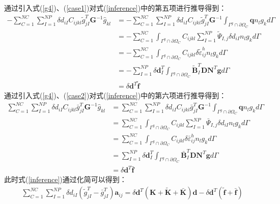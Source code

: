 通过引入式(\ref{g4})、(\ref{case1})对式(\ref{inference})中的第五项进行推导得到：
\begin{equation}
\begin{split}
    -\sum_{C=1}^{N\!C}\sum_{I=1}^{N\!P}\delta d_{iI}C_{ijkl}\tilde{g}^T_{jI}\pmb{G}^{-1}\hat{g}_{kl}
    &=-\sum_{C=1}^{N\!C}\sum_{I=1}^{N\!P}\delta d_{iI}C_{ijkl}\tilde{g}^T_{jI}\pmb{G}^{-1}\int_{\Gamma^g\cap\partial\Omega_C}\pmb{q}n_lg_kd\Gamma\\
    &=-\sum_{C=1}^{N\!C}\int_{\Gamma^g\cap\partial\Omega_C}C_{ijkl}\sum_{I=1}^{N\!P}\tilde{\Psi}_{I,j}\delta d_{iI}n_lg_kd\Gamma\\
    &=-\sum_{C=1}^{N\!C}\int_{\Gamma^g\cap\partial\Omega_C}C_{ijkl}\delta\tilde{\varepsilon}_{ij}^hn_lg_kd\Gamma\\
    &=-\sum_{I=1}^{N\!P}\delta\pmb{d}_I^T\int_{\Gamma^g\cap\partial\Omega_C}\tilde{\pmb{B}}_I^T\pmb{D}\pmb{N}^T\pmb{g}d\Gamma\\
    &=\delta\pmb{d}^T\tilde{\pmb{f}}
\end{split}
\end{equation}
\newpage
通过引入式(\ref{g4})、(\ref{case2})对式(\ref{inference})中的第六项进行推导得到：
\begin{equation}
\begin{split}
    \sum_{C=1}^{N\!C}\sum_{I=1}^{N\!P}\delta d_{iI}C_{ijkl}\bar{g}^T_{jI}\pmb{G}^{-1}\hat{g}_{kl}
    &=\sum_{C=1}^{N\!C}\sum_{I=1}^{N\!P}\delta d_{iI}C_{ijkl}\bar{g}^T_{jI}\pmb{G}^{-1}\int_{\Gamma^g\cap\partial\Omega_C}\pmb{q}n_lg_kd\Gamma\\
    &=\sum_{C=1}^{N\!C}\int_{\Gamma^g\cap\partial\Omega_C}C_{ijkl}\sum_{I=1}^{N\!P}\bar{\Psi}_{I,j}\delta d_{iI}n_lg_kd\Gamma\\
    &=\sum_{C=1}^{N\!C}\int_{\Gamma^g\cap\partial\Omega_C}C_{ijkl}\delta\bar{\varepsilon}_{ij}^hn_lg_kd\Gamma\\
    &=\sum_{I=1}^{N\!P}\delta\pmb{d}_I^T\int_{\Gamma^g\cap\partial\Omega_C}\bar{\pmb{B}}_I^T\pmb{D}\pmb{N}^T\pmb{g}d\Gamma\\
    &=\delta\pmb{d}^T\bar{\pmb{f}}
\end{split}
\end{equation}
此时式(\ref{inference})通过化简可以得到：
\begin{equation}\label{simplify}
\begin{split}
    \sum_{C=1}^{N\!C}\sum_{I=1}^{N\!P}\delta d_{iI}(\tilde{g}_{jI}^T-\bar{g}_{jI}^T)\pmb{a}_{ij}=
    \delta\pmb{d}^T(\pmb{K}+\tilde{\pmb{K}}+\bar{\pmb{K}})\pmb{d}-\delta\pmb{d}^T(\tilde{\pmb{f}}+\bar{\pmb{f}})
\end{split}
\end{equation}\par
